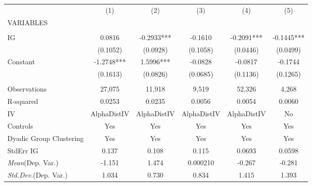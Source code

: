\documentclass[]{article}
\begin{document}
\begin{tabular}{lccccc} \hline
 & (1) & (2) & (3) & (4) & (5) \\
VARIABLES &  &  &  &  &  \\ \hline
 &  &  &  &  &  \\
IG & 0.0816 & -0.2933*** & -0.1610 & -0.2091*** & -0.1445*** \\
 & (0.1052) & (0.0928) & (0.1058) & (0.0446) & (0.0499) \\
Constant & -1.2748*** & 1.5996*** & -0.0828 & -0.0817 & -0.1744 \\
 & (0.1613) & (0.0826) & (0.0685) & (0.1136) & (0.1265) \\
 &  &  &  &  &  \\
Observations & 27,075 & 11,918 & 9,519 & 52,326 & 4,268 \\
R-squared & 0.0253 & 0.0235 & 0.0056 & 0.0054 & 0.0060 \\
IV & AlphaDistIV & AlphaDistIV & AlphaDistIV & AlphaDistIV & No \\
Controls & Yes & Yes & Yes & Yes & Yes \\
Dyadic Group Clustering & Yes & Yes & Yes & Yes & Yes \\
StdErr IG & 0.137 & 0.108 & 0.115 & 0.0693 & 0.0598 \\
\textit{Mean}(Dep. Var.) & -1.151 & 1.474 & 0.000210 & -0.267 & -0.281 \\
 \textit{Std.Dev.}(Dep. Var.) & 1.034 & 0.730 & 0.834 & 1.415 & 1.393 \\ \hline
\end{tabular}
\end{document}
